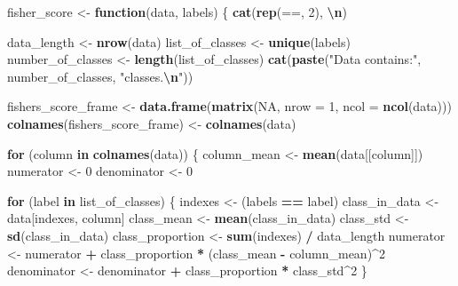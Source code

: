\documentclass[a4paper,conference]{IEEEtran}
\newenvironment{Shaded}{\begin{snugshade}}{\end{snugshade}}
\newcommand{\AttributeTok}[1]{\textcolor[rgb]{0.13,0.29,0.53}{#1}}
\newcommand{\ConstantTok}[1]{\textcolor[rgb]{0.56,0.35,0.01}{#1}}
\newcommand{\ControlFlowTok}[1]{\textcolor[rgb]{0.13,0.29,0.53}{\textbf{#1}}}
\newcommand{\DecValTok}[1]{\textcolor[rgb]{0.00,0.00,0.81}{#1}}
\newcommand{\FunctionTok}[1]{\textcolor[rgb]{0.13,0.29,0.53}{\textbf{#1}}}
\newcommand{\NormalTok}[1]{#1}
\newcommand{\OtherTok}[1]{\textcolor[rgb]{0.56,0.35,0.01}{#1}}
\newcommand{\SpecialCharTok}[1]{\textcolor[rgb]{0.81,0.36,0.00}{\textbf{#1}}}
\newcommand{\StringTok}[1]{\textcolor[rgb]{0.31,0.60,0.02}{#1}}
\begin{document}
\begin{Shaded}
\begin{Highlighting}[]
\NormalTok{fisher\_score }\OtherTok{\textless{}{-}} \ControlFlowTok{function}\NormalTok{(data, labels) \{}
  \FunctionTok{cat}\NormalTok{(}\FunctionTok{rep}\NormalTok{(}\StringTok{\textquotesingle{}==\textquotesingle{}}\NormalTok{, }\DecValTok{2}\NormalTok{), }\StringTok{\textquotesingle{}}\SpecialCharTok{\textbackslash{}n}\StringTok{\textquotesingle{}}\NormalTok{)}

\NormalTok{  data\_length }\OtherTok{\textless{}{-}} \FunctionTok{nrow}\NormalTok{(data)}
\NormalTok{  list\_of\_classes }\OtherTok{\textless{}{-}} \FunctionTok{unique}\NormalTok{(labels)}
\NormalTok{  number\_of\_classes }\OtherTok{\textless{}{-}} \FunctionTok{length}\NormalTok{(list\_of\_classes)}
  \FunctionTok{cat}\NormalTok{(}\FunctionTok{paste}\NormalTok{(}\StringTok{"Data contains:"}\NormalTok{, number\_of\_classes, }\StringTok{"classes.}\SpecialCharTok{\textbackslash{}n}\StringTok{"}\NormalTok{))}

\NormalTok{  fishers\_score\_frame }\OtherTok{\textless{}{-}} \FunctionTok{data.frame}\NormalTok{(}\FunctionTok{matrix}\NormalTok{(}\ConstantTok{NA}\NormalTok{, }\AttributeTok{nrow =} \DecValTok{1}\NormalTok{, }\AttributeTok{ncol =} \FunctionTok{ncol}\NormalTok{(data)))}
  \FunctionTok{colnames}\NormalTok{(fishers\_score\_frame) }\OtherTok{\textless{}{-}} \FunctionTok{colnames}\NormalTok{(data)}

  \ControlFlowTok{for}\NormalTok{ (column }\ControlFlowTok{in} \FunctionTok{colnames}\NormalTok{(data)) \{}
\NormalTok{    column\_mean }\OtherTok{\textless{}{-}} \FunctionTok{mean}\NormalTok{(data[[column]])}
\NormalTok{    numerator }\OtherTok{\textless{}{-}} \DecValTok{0}
\NormalTok{    denominator }\OtherTok{\textless{}{-}} \DecValTok{0}

    \ControlFlowTok{for}\NormalTok{ (label }\ControlFlowTok{in}\NormalTok{ list\_of\_classes) \{}
\NormalTok{      indexes }\OtherTok{\textless{}{-}}\NormalTok{ (labels }\SpecialCharTok{==}\NormalTok{ label)}
\NormalTok{      class\_in\_data }\OtherTok{\textless{}{-}}\NormalTok{ data[indexes, column]}
\NormalTok{      class\_mean }\OtherTok{\textless{}{-}} \FunctionTok{mean}\NormalTok{(class\_in\_data)}
\NormalTok{      class\_std }\OtherTok{\textless{}{-}} \FunctionTok{sd}\NormalTok{(class\_in\_data)}
\NormalTok{      class\_proportion }\OtherTok{\textless{}{-}} \FunctionTok{sum}\NormalTok{(indexes) }\SpecialCharTok{/}\NormalTok{ data\_length}
\NormalTok{      numerator }\OtherTok{\textless{}{-}}\NormalTok{ numerator }\SpecialCharTok{+}\NormalTok{ class\_proportion }\SpecialCharTok{*}\NormalTok{ (class\_mean }\SpecialCharTok{{-}}\NormalTok{ column\_mean)}\SpecialCharTok{\^{}}\DecValTok{2}
\NormalTok{      denominator }\OtherTok{\textless{}{-}}\NormalTok{ denominator }\SpecialCharTok{+}\NormalTok{ class\_proportion }\SpecialCharTok{*}\NormalTok{ class\_std}\SpecialCharTok{\^{}}\DecValTok{2}
\NormalTok{    \}}


\end{Highlighting}
\end{Shaded}
\end{document}
